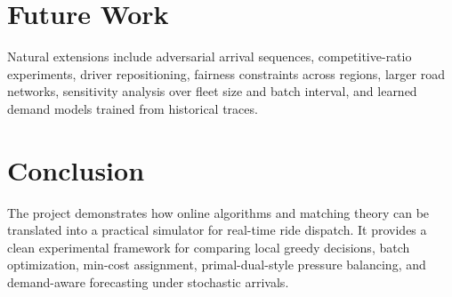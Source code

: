 \documentclass[11pt]{article}
\begin{document}
\section{Future Work}

Natural extensions include adversarial arrival sequences, competitive-ratio experiments, driver repositioning, fairness constraints across regions, larger road networks, sensitivity analysis over fleet size and batch interval, and learned demand models trained from historical traces.

\section{Conclusion}

The project demonstrates how online algorithms and matching theory can be translated into a practical simulator for real-time ride dispatch. It provides a clean experimental framework for comparing local greedy decisions, batch optimization, min-cost assignment, primal-dual-style pressure balancing, and demand-aware forecasting under stochastic arrivals.
\end{document}
